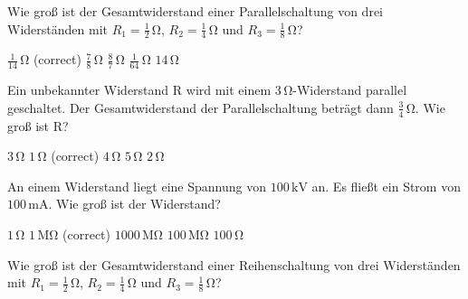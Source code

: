 \documentclass[11pt]{exam}
\begin{document}
\setlength{\voffset}{-0.5in}
\setlength{\headsep}{5pt}

\hspace{2mm}
 \hspace{5mm}
\vspace{4mm}

\begin{questions}

\question Wie groß ist der Gesamtwiderstand einer Parallelschaltung von drei Widerständen mit \(R_1=\mathrm{\frac{1}{2}\,\Omega}\), \(R_2=\mathrm{\frac{1}{4}\,\Omega}\) und \(R_3=\mathrm{\frac{1}{8}\,\Omega}\)?

\begin{choices}
	\choice \(\mathrm{\frac{1}{14}\,\Omega}\) (correct)
	\choice \(\mathrm{\frac{7}{8}\,\Omega}\)
	\choice \(\mathrm{\frac{8}{7}\,\Omega}\)
	\choice \(\mathrm{\frac{1}{64}\,\Omega}\)
	\choice \(\mathrm{14\,\Omega}\)
\end{choices}

\vspace{3mm}\question Ein unbekannter Widerstand \(\mathrm{R}\) wird mit einem \(\mathrm{3\,\Omega}\)-Widerstand parallel geschaltet. Der Gesamtwiderstand der Parallelschaltung beträgt dann \(\mathrm{\frac{3}{4}\,\Omega}\). Wie groß ist \(\mathrm{R}\)?

\begin{choices}
	\choice \(\mathrm{3\,\Omega}\)
	\choice \(\mathrm{1\,\Omega}\) (correct)
	\choice \(\mathrm{4\,\Omega}\)
	\choice \(\mathrm{5\,\Omega}\)
	\choice \(\mathrm{2\,\Omega}\)
\end{choices}

\vspace{3mm}\question An einem Widerstand liegt eine Spannung von \(\mathrm{100\,kV}\) an. Es fließt ein Strom von \(\mathrm{100\,mA}\). Wie groß ist der Widerstand?

\begin{choices}
	\choice \(\mathrm{1\,\Omega}\)
	\choice \(\mathrm{1\,M\Omega}\) (correct)
	\choice \(\mathrm{1000\,M\Omega}\)
	\choice \(\mathrm{100\,M\Omega}\)
	\choice \(\mathrm{100\,\Omega}\)
\end{choices}

\vspace{3mm}\question Wie groß ist der Gesamtwiderstand einer Reihenschaltung von drei Widerständen mit \(R_1=\mathrm{\frac{1}{2}\,\Omega}\), \(R_2=\mathrm{\frac{1}{4}\,\Omega}\) und \(R_3=\mathrm{\frac{1}{8}\,\Omega}\)?


\end{questions}
\end{document}
